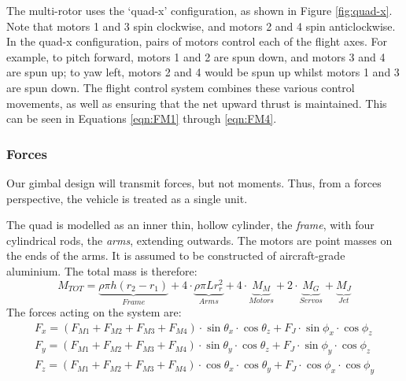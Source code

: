 \documentclass[11pt]{article}
\begin{document}
The multi-rotor uses the `quad-x' configuration, as shown in Figure \ref{fig:quad-x}. Note that motors 1 and 3 spin clockwise, and motors 2 and 4 spin anticlockwise. In the quad-x configuration, pairs of motors control each of the flight axes. For example, to pitch forward, motors 1 and 2 are spun down, and motors 3 and 4 are spun up; to yaw left, motors 2 and 4 would be spun up whilst motors 1 and 3 are spun down. The flight control system combines these various control movements, as well as ensuring that the net upward thrust is maintained. This can be seen in Equations \ref{eqn:FM1} through \ref{eqn:FM4}.


\subsubsection{Forces}\label{sec:Forces}
Our gimbal design will transmit forces, but not moments. Thus, from a forces perspective, the vehicle is treated as a single unit.

The quad is modelled as an inner thin, hollow cylinder, the \emph{frame}, with four cylindrical rods, the \emph{arms}, extending outwards. The motors are point masses on the ends of the arms. It is assumed to be constructed of aircraft-grade aluminium. The total mass is therefore:
\begin{equation}
    M_{TOT} = \underbrace{\rho\pi h (r_2-r_1)}_{Frame} + 4\cdot\underbrace{\rho\pi L r_r^2}_{Arms} + 4\cdot\underbrace{M_M}_{Motors} + 2\cdot\underbrace{M_G}_{Servos} + \underbrace{M_J}_{Jet} \label{eqn:total_mass}
\end{equation}
The forces acting on the system are:
\begin{eqnarray}
    F_x = (F_{M1} + F_{M2} + F_{M3} + F_{M4})\cdot\sin{\theta_x}\cdot\cos{\theta_z} +  F_J\cdot\sin{\phi_x}\cdot\cos{\phi_z} \\
    F_y = (F_{M1} + F_{M2} + F_{M3} + F_{M4})\cdot\sin{\theta_y}\cdot\cos{\theta_z} +  F_J\cdot\sin{\phi_y}\cdot\cos{\phi_z} \\
    F_z = (F_{M1} + F_{M2} + F_{M3} + F_{M4})\cdot\cos{\theta_x}\cdot\cos{\theta_y} +  F_J\cdot\cos{\phi_x}\cdot\cos{\phi_y}
\end{eqnarray}
\end{document}
